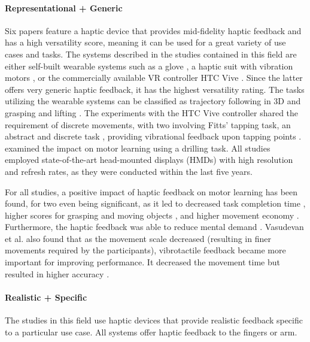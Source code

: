 \paragraph{Representational + Generic} \label{sec:representationalgeneric}
Six papers feature a haptic device that provides mid-fidelity haptic feedback and has a high versatility score, meaning it can be used for a great variety of use cases and tasks. The systems described in the studies contained in this field are either self-built wearable systems such as a glove \cite{LiuH2019, Trinitatova2023}, a haptic suit with vibration motors \cite{Xia2023}, or the commercially available VR controller HTC Vive \cite{Vasudevan2020, Yang2023, McAnally2023}. Since the latter offers very generic haptic feedback, it has the highest versatility rating. 
The tasks utilizing the wearable systems can be classified as trajectory following in 3D \cite{Trinitatova2023, Xia2023} and grasping and lifting \cite{LiuH2019}. The experiments with the HTC Vive controller shared the requirement of discrete movements, with two involving Fitts' tapping task, an abstract and discrete task \cite{Fitts1954TheMovement}, providing vibrational feedback upon tapping points \cite{Vasudevan2020, McAnally2023}. \cite{Yang2023} examined the impact on motor learning using a drilling task. All studies employed state-of-the-art head-mounted displays (HMDs) with high resolution and refresh rates, as they were conducted within the last five years.

For all studies, a positive impact of haptic feedback on motor learning has been found, for two even being significant, as it led to decreased task completion time \cite{Yang2023, McAnally2023}, higher scores for grasping and moving objects \cite{LiuH2019}, and higher movement economy \cite{McAnally2023}. Furthermore, the haptic feedback was able to reduce mental demand \cite{Trinitatova2023, Yang2023}.
Vasudevan et al. also found that as the movement scale decreased (resulting in finer movements required by the participants), vibrotactile feedback became more important for improving performance. It decreased the movement time but resulted in higher accuracy \cite{Vasudevan2020}. 

\paragraph{Realistic + Specific} \label{sec:realisticspecific}

The studies in this field use haptic devices that provide realistic feedback specific to a particular use case. All systems offer haptic feedback to the fingers or arm.

